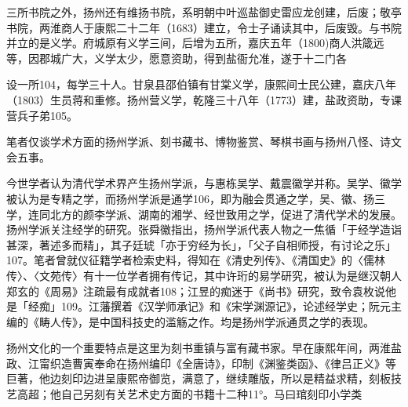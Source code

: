 三所书院之外，扬州还有维扬书院，系明朝中叶巡盐御史雷应龙创建，后废；敬亭书院，两淮商人于康熙二十二年（1683）建立，令士子诵读其中，后废毁。与书院并立的是义学。府城原有义学三间，后增为五所，嘉庆五年（1800)商人洪箴远等，因郡城广大，义学太少，愿意资助，得到盐衙允准，遂于十二门各

\vfill
\begin{BookNotes}
\end{BookNotes}

\noindent 设一所104，每学三十人。甘泉县邵伯镇有甘棠义学，康熙间士民公建，嘉庆八年（1803）生员蒋和重修。扬州营义学，乾隆三十八年（1773）建，盐政资助，专课营兵子弟105。


笔者仅谈学术方面的扬州学派、刻书藏书、博物鉴赏、琴棋书画与扬州八怪、诗文会五事。

今世学者认为清代学术界产生扬州学派，与惠栋吴学、戴震徽学并称。吴学、徽学被认为是专精之学，而扬州学派是通学106，即为融会贯通之学，吴、徽、扬三学，连同北方的颜李学派、湖南的湘学、经世致用之学，促进了清代学术的发展。扬州学派关注经学的研究。张舜徽指出，扬州学派代表人物之一焦循「于经学造诣甚深，著述多而精」，其子廷琥「亦于穷经为长」，「父子自相师授，有讨论之乐」107。笔者曾就仪征籍学者检索史料，得知在《清史列传》、《清国史》的〈儒林传〉、〈文苑传〉有十一位学者拥有传记，其中许珩的易学研究，被认为是继汉朝人郑玄的《周易》注疏最有成就者108；江昱的痴迷于《尚书》研究，致令袁枚说他是「经痴」109。江藩撰着《汉学师承记》和《宋学渊源记》，论述经学史；阮元主编的《畴人传》，是中国科技史的滥觞之作。均是扬州学派通贯之学的表现。

扬州文化的一个重要特点是这里为刻书重镇与富有藏书家。早在康熙年间，两淮盐政、江甯织造曹寅奉命在扬州编印《全唐诗》，印制《渊鉴类函》、《律吕正义》等巨著，他边刻印边进呈康熙帝御览，满意了，继续雕版，所以是精益求精，刻板技艺高超；他自己另刻有关艺术史方面的书籍十二种11°。马曰琯刻印小学类

\vfill
\begin{BookNotes}
\end{BookNotes}

